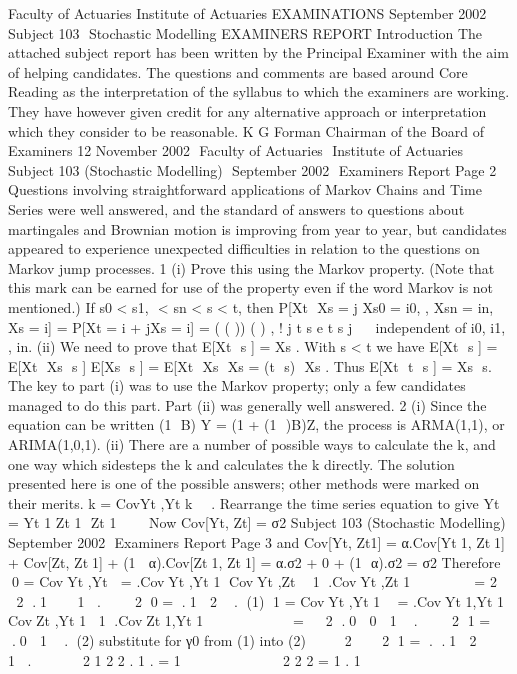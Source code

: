 Faculty of Actuaries Institute of Actuaries
EXAMINATIONS
September 2002
Subject 103  Stochastic Modelling
EXAMINERS REPORT
Introduction
The attached subject report has been written by the Principal Examiner with the aim of
helping candidates.  The questions and comments are based around Core Reading as the
interpretation of the syllabus to which the examiners are working.  They have however
given credit for any alternative approach or interpretation which they consider to be
reasonable.
K G Forman
Chairman of the Board of Examiners
12 November 2002
 Faculty of Actuaries
 Institute of Actuaries
Subject 103 (Stochastic Modelling)  September 2002  Examiners Report
Page 2
Questions involving straightforward applications of Markov Chains and Time Series were
well answered, and the standard of answers to questions about martingales and Brownian
motion is improving from year to year, but candidates appeared to experience unexpected
difficulties in relation to the questions on Markov jump processes.
1 (i) Prove this using the Markov property. (Note that this mark can be earned for
use of the property even if the word Markov is not mentioned.)
If s0 < s1,  < sn < s < t, then
P[Xt  Xs = j
Xs0 = i0, , Xsn = in, Xs = i]
= P[Xt = i + jXs = i] = ( ( )) ( ) ,
!
j
t s e t s
j
   
independent of i0, i1, , in.
(ii) We need to prove that E[Xt  s ] = Xs .
With s < t we have
E[Xt  s ] = E[Xt  Xs  s ] E[Xs  s ]
= E[Xt  Xs  Xs = (t  s)  Xs .
Thus E[Xt  t  s ] = Xs  s.
The key to part (i) was to use the Markov property; only a few candidates managed to do this
part. Part (ii) was generally well answered.
2 (i) Since the equation can be written (1  B) Y = (1 + (1  )B)Z, the process is
ARMA(1,1), or ARIMA(1,0,1).
(ii) There are a number of possible ways to calculate the k, and one way which
sidesteps the k and calculates the k directly. The solution presented here is
one of the possible answers; other methods were marked on their merits.
k = CovYt ,Yt k    .
Rearrange the time series equation to give Yt = Yt 1 Zt 1  Zt 1      
Now Cov[Yt, Zt] = σ2
Subject 103 (Stochastic Modelling)  September 2002  Examiners Report
Page 3
and Cov[Yt, Zt1] = α.Cov[Yt1, Zt1] + Cov[Zt, Zt1] + (1  α).Cov[Zt1, Zt1]
= α.σ2 + 0 + (1  α).σ2 = σ2
Therefore
0 = CovYt ,Yt  = .CovYt ,Yt 1 CovYt ,Zt  1 .CovYt ,Zt 1      
= 2   2
.1    1 .
   2
0 = .1  2  . (1)
1 = CovYt ,Yt 1 
= .CovYt 1,Yt 1 CovZt ,Yt 1 1 .CovZt 1,Yt 1     
   
=   2
.0  0  1  .
   2
1 = .0  1  . (2)
substitute for γ0 from (1) into (2)
    2    2
1 = . .1  2     1 .

    2
1 2
2 . 1 .
=
1
         	

2
2
2
= 1 .
1
    
       	 

